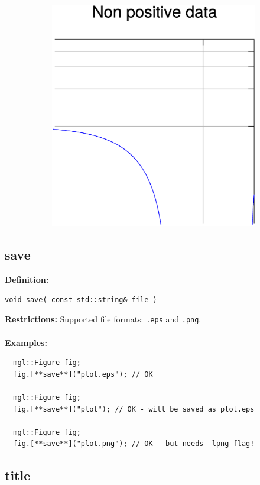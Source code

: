 \documentclass[a4paper]{article}
\newcommand{\command}[1]{\subsection{#1}}
\begin{document}
\begin{figure}
\begin{subfigure}[hb]{0.32\linewidth}
  \end{subfigure}
  \hfill
  \begin{subfigure}[hb]{0.32\linewidth}
    \includegraphics[width=\textwidth]{./examples_from_doc/ranges/ranges_3.eps}
  \end{subfigure}
\end{figure}

\command{save}

\textbf{Definition:}
\begin{lstlisting}
void save( const std::string& file )
\end{lstlisting}
%
\textbf{Restrictions:} Supported file formats: \texttt{.eps} and \texttt{.png}. \\ \\
%
\textbf{Examples:}
\begin{lstlisting}
  mgl::Figure fig;
  fig.[**save**]("plot.eps"); // OK

  mgl::Figure fig;
  fig.[**save**]("plot"); // OK - will be saved as plot.eps

  mgl::Figure fig;
  fig.[**save**]("plot.png"); // OK - but needs -lpng flag!
\end{lstlisting}

\command{title}
\end{document}
